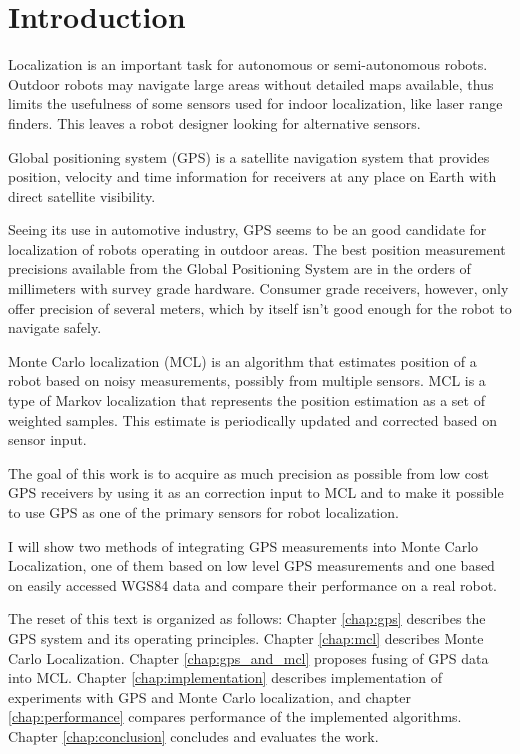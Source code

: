 \chapter{Introduction}

Localization is an important task for autonomous or semi-autonomous robots.
Outdoor robots may navigate large areas without detailed maps available, thus limits
the usefulness of some sensors used for indoor localization, like laser range finders.
This leaves a robot designer looking for alternative sensors.


Global positioning system (GPS) is a satellite navigation system that
provides position, velocity and time information for receivers at any place on Earth with direct
satellite visibility.

Seeing its use in automotive industry, GPS seems to be an good candidate for
localization of robots operating in outdoor areas.
The best position measurement precisions available from the Global Positioning System
are in the orders of millimeters with survey grade hardware.
Consumer grade receivers, however, only offer precision of several meters, which
by itself isn't good enough for the robot to navigate safely.


Monte Carlo localization (MCL) is an algorithm that estimates position of a robot
based on noisy measurements, possibly from multiple sensors.
MCL is a type of Markov localization that represents the position estimation as
a set of weighted samples.
This estimate is periodically updated and corrected based on sensor input.


\vspace{1.5em}


The goal of this work is to acquire as much precision as possible from low cost
GPS receivers by using it as an correction input to MCL and to make it possible to use
GPS as one of the primary sensors for robot localization.

I will show two methods of integrating GPS measurements into Monte Carlo Localization,
one of them based on low level GPS measurements and one based on easily accessed WGS84 data
and compare their performance on a real robot.



The reset of this text is organized as follows:
Chapter \ref{chap:gps} describes the GPS system and its operating principles.
Chapter \ref{chap:mcl} describes Monte Carlo Localization.
Chapter \ref{chap:gps_and_mcl} proposes fusing of GPS data into MCL.
Chapter \ref{chap:implementation} describes implementation of experiments with GPS and
Monte Carlo localization,
and chapter \ref{chap:performance} compares performance of the implemented algorithms.
Chapter \ref{chap:conclusion} concludes and evaluates the work.
